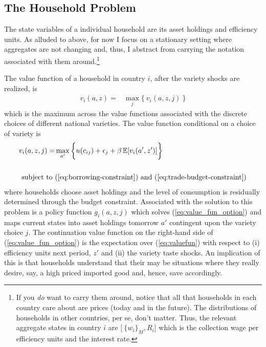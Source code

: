 \documentclass[12pt,pdftex]{article}
\begin{document}
\begin{onehalfspacing}
\subsection{The Household Problem}

The state variables of a individual household are its asset holdings and efficiency units. As alluded to above, for now I focus on a stationary setting where aggregates are not changing and, thus, I abstract from carrying the notation associated with them around.\footnote{If you \emph{do} want to carry them around, notice that all that households in each country care about are prices (today and in the future). The distributions of households in other countries, per se, don't matter. Thus, the relevant aggregate states in country $i$ are $\big [ \ \{ w_i \}_{M}, R_i \big ]$ which is the collection wage per efficiency units and the interest rate.}

The value function of a household in country $i$, after the variety shocks are realized, is
\begin{align}
v_{i}(a, z) = &  \max_{j} \big  \{ \  v_{i}(a, z, j)  \ \big \}
\label{eq:valuefun}
\end{align}
which is the maximum across the value functions associated with the discrete choices of different national varieties. The value function conditional on a choice of variety is
\begin{align}
v_{i}(a, z, j) = &  \max_{\ a' \ }\bigg  \{ u(c_{ij}) + \epsilon_{j}  + \beta \, \mathbb{E} [v_{i}(a', z')]  \bigg\}
\label{eq:value_fun_option} \\
\nonumber \\
\mbox{subject to}  \ & (\ref{eq:borrowing-constraint}) \  \mathrm{and} \ (\ref{eq:trade-budget-constraint}) \nonumber
\end{align}
where households choose asset holdings and the level of consumption is residually determined through the budget constraint. Associated with the solution to this problem is a policy function $g_{i}(a,z, j)$ which solves (\ref{eq:value_fun_option}) and maps current states into asset holdings tomorrow $a'$ contingent upon the variety choice $j$. The continuation value function on the right-hand side of (\ref{eq:value_fun_option}) is the expectation over (\ref{eq:valuefun}) with respect to (i) efficiency units next period, $z'$ and (ii) the variety taste shocks. An implication of this is that households understand that their may be situations where they really desire, say, a high priced imported good and, hence, save accordingly.


\end{onehalfspacing}
\end{document}
